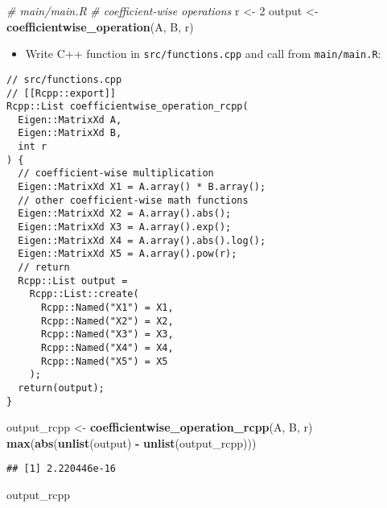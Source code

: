 \documentclass[
]{book}
\newenvironment{Shaded}{\begin{snugshade}}{\end{snugshade}}
\newcommand{\CommentTok}[1]{\textcolor[rgb]{0.56,0.35,0.01}{\textit{#1}}}
\newcommand{\DecValTok}[1]{\textcolor[rgb]{0.00,0.00,0.81}{#1}}
\newcommand{\FunctionTok}[1]{\textcolor[rgb]{0.13,0.29,0.53}{\textbf{#1}}}
\newcommand{\NormalTok}[1]{#1}
\newcommand{\OtherTok}[1]{\textcolor[rgb]{0.56,0.35,0.01}{#1}}
\newcommand{\SpecialCharTok}[1]{\textcolor[rgb]{0.81,0.36,0.00}{\textbf{#1}}}
\providecommand{\tightlist}{%
  \setlength{\itemsep}{0pt}\setlength{\parskip}{0pt}}
\begin{document}
\begin{Shaded}
\begin{Highlighting}[]
\CommentTok{\# main/main.R}
\CommentTok{\# coefficient{-}wise operations}
\NormalTok{r }\OtherTok{\textless{}{-}} \DecValTok{2}
\NormalTok{output }\OtherTok{\textless{}{-}} \FunctionTok{coefficientwise\_operation}\NormalTok{(A, B, r)}
\end{Highlighting}
\end{Shaded}

\begin{itemize}
\tightlist
\item
  Write C++ function in \texttt{src/functions.cpp} and call from \texttt{main/main.R}:
\end{itemize}

\begin{verbatim}
// src/functions.cpp
// [[Rcpp::export]]
Rcpp::List coefficientwise_operation_rcpp(
  Eigen::MatrixXd A,
  Eigen::MatrixXd B,
  int r
) {
  // coefficient-wise multiplication
  Eigen::MatrixXd X1 = A.array() * B.array();
  // other coefficient-wise math functions
  Eigen::MatrixXd X2 = A.array().abs();
  Eigen::MatrixXd X3 = A.array().exp();
  Eigen::MatrixXd X4 = A.array().abs().log();
  Eigen::MatrixXd X5 = A.array().pow(r);
  // return
  Rcpp::List output =
    Rcpp::List::create(
      Rcpp::Named("X1") = X1,
      Rcpp::Named("X2") = X2,
      Rcpp::Named("X3") = X3,
      Rcpp::Named("X4") = X4,
      Rcpp::Named("X5") = X5
    );
  return(output);
}
\end{verbatim}

\begin{Shaded}
\begin{Highlighting}[]
\NormalTok{output\_rcpp }\OtherTok{\textless{}{-}} \FunctionTok{coefficientwise\_operation\_rcpp}\NormalTok{(A, B, r)}
\FunctionTok{max}\NormalTok{(}\FunctionTok{abs}\NormalTok{(}\FunctionTok{unlist}\NormalTok{(output) }\SpecialCharTok{{-}} \FunctionTok{unlist}\NormalTok{(output\_rcpp)))}
\end{Highlighting}
\end{Shaded}

\begin{verbatim}
## [1] 2.220446e-16
\end{verbatim}

\begin{Shaded}
\begin{Highlighting}[]
\NormalTok{output\_rcpp}
\end{Highlighting}
\end{Shaded}
\end{document}
